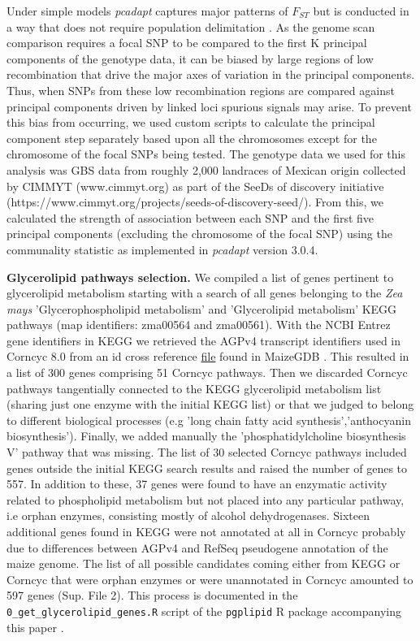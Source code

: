 \documentclass[9pt,twocolumn,twoside,lineno]{biorxiv}
\begin{document}
Under simple models \textit{pcadapt} captures major patterns of $F_{ST}$  but is conducted in a way that does not require population delimitation \cite{duforet2014genome}.
As the genome scan comparison requires a focal SNP to be compared to the first K principal components of the genotype data, it can be biased by large regions of low recombination that drive the major axes of variation in the principal components.
Thus, when SNPs from these low recombination regions are compared against principal components driven by linked loci spurious signals may arise.
To prevent this bias from occurring, we used custom scripts to calculate the principal component step separately based upon all the chromosomes except for the chromosome of the focal SNPs being tested.
The genotype data we used for this analysis was GBS data from roughly 2,000 landraces of Mexican origin collected by CIMMYT (www.cimmyt.org) as part of the SeeDs of discovery initiative (https://www.cimmyt.org/projects/seeds-of-discovery-seed/).
From this, we calculated the strength of association between each SNP and the first five principal components (excluding the chromosome of the focal SNP) using the communality statistic as implemented in \textit{pcadapt} version 3.0.4.

\textbf{Glycerolipid pathways selection.}
We compiled a list of genes pertinent to glycerolipid metabolism starting with a search of all genes belonging to the \textit{Zea mays} 'Glycerophospholipid metabolism' and 'Glycerolipid metabolism' KEGG pathways \cite{kanehisa2019} (map identifiers: zma00564 and zma00561). 
With the NCBI Entrez gene identifiers in KEGG we retrieved the AGPv4 transcript identifiers used in Corncyc 8.0 \cite{portwood2019, walsh2016} from an id cross reference \href{https://www.maizegdb.org/search/gene/download_gene_xrefs.php?relative=v4}{file} found in MaizeGDB   \cite{portwood2019}.
This resulted in a list of 300 genes comprising 51 Corncyc pathways. 
Then we discarded Corncyc pathways  tangentially connected to the KEGG glycerolipid metabolism list (sharing just one enzyme with the initial KEGG list) or that we judged to belong to different biological processes (e.g 'long chain fatty acid synthesis','anthocyanin biosynthesis'). 
Finally, we added manually the 'phosphatidylcholine biosynthesis V' pathway that was missing. 
The list of 30 selected Corncyc pathways included genes outside the initial KEGG search results and raised the number of genes to 557. 
In addition to these, 37 genes were found to have an enzymatic activity related to phospholipid metabolism but not placed into any particular pathway, i.e orphan enzymes, consisting mostly of alcohol dehydrogenases. 
Sixteen additional genes found in KEGG were not annotated at all in Corncyc probably due to differences between AGPv4 and RefSeq pseudogene annotation of the maize genome. 
The list of all possible candidates coming either from KEGG or Corncyc that were orphan enzymes or were unannotated in Corncyc amounted to 597 genes (Sup. File 2). 
This process is documented in the \verb|0_get_glycerolipid_genes.R| script of the \verb|pgplipid| R package accompanying this paper \cite{fausto_rodriguez_zapata_2020_4323410}.
\end{document}
